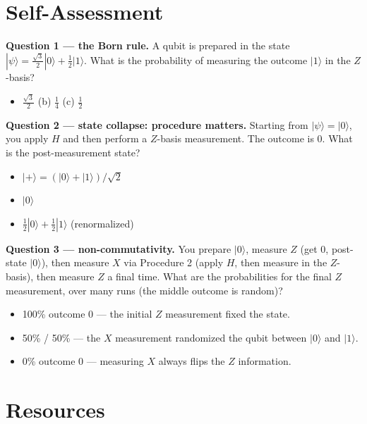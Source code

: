 \documentclass[a4paper,11pt]{article}
\newcommand{\keepspace}[1]{\par\vspace{0pt plus #1}\penalty-300\vspace{0pt plus -#1}}
\providecommand{\ket}[1]{|{#1}\rangle}
\begin{document}
\keepspace{10\baselineskip}
\section{Self-Assessment}

\begin{reflectionbox}
\textbf{Question 1 --- the Born rule.} A qubit is prepared in the state
$\ket{\psi} = \frac{\sqrt 3}{2}\ket{0} + \frac12\ket{1}$. What is the probability of
measuring the outcome $\ket{1}$ in the $Z$-basis?
\begin{itemize}
    \item[(a)] $\frac{\sqrt 3}{2}$ \qquad (b) $\frac14$ \qquad (c) $\frac12$
\end{itemize}

\textbf{Question 2 --- state collapse: procedure matters.} Starting from
$\ket{\psi} = \ket{0}$, you apply $H$ and then perform a $Z$-basis measurement. The
outcome is 0. What is the post-measurement state?
\begin{itemize}
    \item[(a)] $\ket{+} = (\ket{0} + \ket{1})/\sqrt 2$
    \item[(b)] $\ket{0}$
    \item[(c)] $\frac12\ket{0} + \frac12\ket{1}$ (renormalized)
\end{itemize}

\textbf{Question 3 --- non-commutativity.} You prepare $\ket{0}$, measure $Z$ (get 0,
post-state $\ket{0}$), then measure $X$ via Procedure 2 (apply $H$, then measure in the
$Z$-basis), then measure $Z$ a final time. What are the probabilities for the final $Z$
measurement, over many runs (the middle outcome is random)?
\begin{itemize}
    \item[(a)] 100\% outcome 0 --- the initial $Z$ measurement fixed the state.
    \item[(b)] 50\% / 50\% --- the $X$ measurement randomized the qubit between $\ket{0}$
               and $\ket{1}$.
    \item[(c)] 0\% outcome 0 --- measuring $X$ always flips the $Z$ information.
\end{itemize}
\end{reflectionbox}

\keepspace{10\baselineskip}
\section{Resources}
\end{document}
